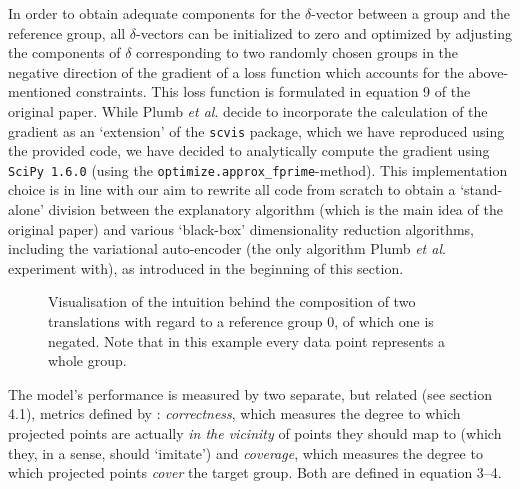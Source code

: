 In order to obtain adequate components for the $\delta$-vector between a group and the reference group, all $\delta$-vectors can be initialized to zero and optimized by adjusting the components of $\delta$ corresponding to two randomly chosen groups in the negative direction of the gradient of a loss function which accounts for the above-mentioned constraints. This loss function is formulated in equation 9 of the original paper. While Plumb \textit{et al}. decide to incorporate the calculation of the gradient as an `extension' of the \texttt{scvis} package, which we have reproduced using the provided code, we have decided to analytically compute the gradient using \texttt{SciPy 1.6.0} (using the \texttt{optimize.approx\_fprime}-method). This implementation choice is in line with our aim to rewrite all code from scratch to obtain a `stand-alone' division between the explanatory algorithm (which is the main idea of the original paper) and various `black-box' dimensionality reduction algorithms, including the variational auto-encoder (the only algorithm Plumb \textit{et al}. experiment with), as introduced in the beginning of this section.\\

\begin{figure}
  \centering
  \scalebox{0.784}{}
  \caption{Visualisation of the intuition behind the composition of two translations with regard to a reference group $0$, of which one is negated. Note that in this example every data point represents a whole group.}
\end{figure}

The model's performance is measured by two separate, but related (see section 4.1), metrics defined by \cite[p.~3]{plumb2020explaining}: \textit{correctness}, which measures the degree to which projected points are actually \textit{in the vicinity} of points they should map to (which they, in a sense, should `imitate') and \textit{coverage}, which measures the degree to which projected points \textit{cover} the target group. Both are defined in equation 3--4.

